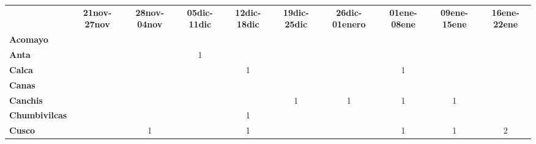 \begin{tabular}{lccccccccc}
	&\textbf{21nov-27nov} 	  					&\textbf{28nov-04nov} 	
	&\textbf{05dic-11dic}						&\textbf{12dic-18dic}			&\textbf{19dic-25dic}
	&\textbf{26dic-01enero}						&\textbf{01ene-08ene}			&\textbf{09ene-15ene}
	&\textbf{16ene-22ene}\\
	\textbf{Acomayo}                        	
	&\cellcolor[HTML]{FCC46C}                   &\cellcolor[HTML]{FCC46C}  			        &\cellcolor[HTML]{FCC46C}          			&\cellcolor[HTML]{FCC46C} 					&\cellcolor[HTML]{FCC46C} 	    			&\cellcolor[HTML]{FCC46C}				    &\cellcolor[HTML]{FCC46C}
	&\cellcolor[HTML]{FCC46C}				&\cellcolor[HTML]{FCC46C}\\
	\textbf{Anta}                                                          		
	&\cellcolor[HTML]{FCC46C}					&\cellcolor[HTML]{FCC46C} 					
	&1											&\cellcolor[HTML]{FCC46C}					
	&\cellcolor[HTML]{FCC46C}					&\cellcolor[HTML]{FCC46C} 
	&\cellcolor[HTML]{FCC46C}					&\cellcolor[HTML]{FCC46C}
	&\cellcolor[HTML]{FCC46C}\\
	\textbf{Calca}      				       
	&\cellcolor[HTML]{FCC46C}                   &\cellcolor[HTML]{FCC46C}  		            &\cellcolor[HTML]{FCC46C} 					&1 								            
	&\cellcolor[HTML]{FCC46C}					&\cellcolor[HTML]{FCC46C} 
	&1											&\cellcolor[HTML]{FCC46C}	&\cellcolor[HTML]{FCC46C}\\                										
	\textbf{Canas}                              
	 &\cellcolor[HTML]{FCC46C} 					&\cellcolor[HTML]{FCC46C}       			&\cellcolor[HTML]{FCC46C} 
	&\cellcolor[HTML]{FCC46C} 					&\cellcolor[HTML]{FCC46C} 		&\cellcolor[HTML]{FCC46C}					&\cellcolor[HTML]{FCC46C} 		
	&\cellcolor[HTML]{FCC46C}					&\cellcolor[HTML]{FCC46C}\\
	\textbf{Canchis}                            
	&\cellcolor[HTML]{FCC46C}   				&\cellcolor[HTML]{FCC46C} 							&\cellcolor[HTML]{FCC46C}					&\cellcolor[HTML]{FCC46C} 		
	&1											&1
	&1											&1
	&\cellcolor[HTML]{FCC46C}\\
	\textbf{Chumbivilcas}                      
	&\cellcolor[HTML]{FCC46C}   			    &\cellcolor[HTML]{FCC46C}
	&\cellcolor[HTML]{FCC46C}					&1			
	&\cellcolor[HTML]{FCC46C}					&\cellcolor[HTML]{FCC46C}
	&\cellcolor[HTML]{FCC46C}					&\cellcolor[HTML]{FCC46C}
	&\cellcolor[HTML]{FCC46C} \\
	\textbf{Cusco}                             
	&\cellcolor[HTML]{FCC46C} 		 			&1											
	&\cellcolor[HTML]{FCC46C}					&1											
	&\cellcolor[HTML]{FCC46C}					&\cellcolor[HTML]{FCC46C}
	&1											&1
	&2\\

\end{tabular}
